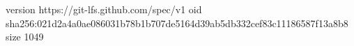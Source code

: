 version https://git-lfs.github.com/spec/v1
oid sha256:021d2a4a0ae086031b78b1b707de5164d39ab5db332cef83c11186587f13a8b8
size 1049
